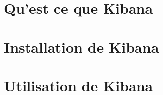 \section{Qu'est ce que Kibana}



\section{Installation de Kibana}



\section{Utilisation de Kibana}


